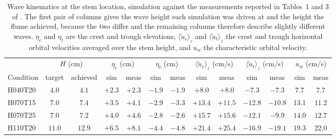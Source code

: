 \begin{table}[!ht]
\centering
\small
\caption{Wave kinematics at the stem location, simulation against the measurements reported in Tables~1 and 3 of \citet{jacobsen_waveinduced_2019}. The first pair of columns gives the wave height each simulation was driven at and the height the flume achieved, because the two differ and the remaining columns therefore describe slightly different waves. $\eta_c$ and $\eta_t$ are the crest and trough elevations, $\langle \tilde{u}_c \rangle_z$ and $\langle \tilde{u}_t \rangle_z$ the crest and trough horizontal orbital velocities averaged over the stem height, and $u_w$ the characteristic orbital velocity.}
\label{tab:flexveg_wave_check}
\footnotesize
\setlength{\tabcolsep}{3.5pt}
\renewcommand{\arraystretch}{1.15}
\begin{tabular}{l cc cc cc cc cc cc}
\toprule
 & \multicolumn{2}{c}{$H$ (cm)} & \multicolumn{2}{c}{$\eta_c$ (cm)} & \multicolumn{2}{c}{$\eta_t$ (cm)} & \multicolumn{2}{c}{$\langle \tilde{u}_c \rangle_z$ (cm/s)} & \multicolumn{2}{c}{$\langle \tilde{u}_t \rangle_z$ (cm/s)} & \multicolumn{2}{c}{$u_w$ (cm/s)} \\
\cmidrule(lr){2-3}\cmidrule(lr){4-5}\cmidrule(lr){6-7}\cmidrule(lr){8-9}\cmidrule(lr){10-11}\cmidrule(lr){12-13}
Condition & target & achieved & sim & meas & sim & meas & sim & meas & sim & meas & sim & meas \\
\midrule
H040T20 & $4.0$  & $4.1$  & $+2.3$ & $+2.3$ & $-1.9$ & $-1.9$ & $+8.0$  & $+8.0$  & $-7.3$  & $-7.3$  & $7.7$  & $7.7$ \\
H070T15 & $7.0$  & $7.4$  & $+3.5$ & $+4.1$ & $-2.9$ & $-3.3$ & $+13.4$ & $+11.5$ & $-12.8$ & $-10.8$ & $13.1$ & $11.2$ \\
H070T25 & $7.0$  & $7.2$  & $+4.0$ & $+4.6$ & $-2.8$ & $-2.6$ & $+15.7$ & $+15.6$ & $-12.1$ & $-9.9$  & $14.0$ & $12.7$ \\
H110T20 & $11.0$ & $12.9$ & $+6.5$ & $+8.1$ & $-4.4$ & $-4.8$ & $+21.4$ & $+25.4$ & $-16.9$ & $-19.1$ & $19.3$ & $22.0$ \\
\bottomrule
\end{tabular}
\end{table}

